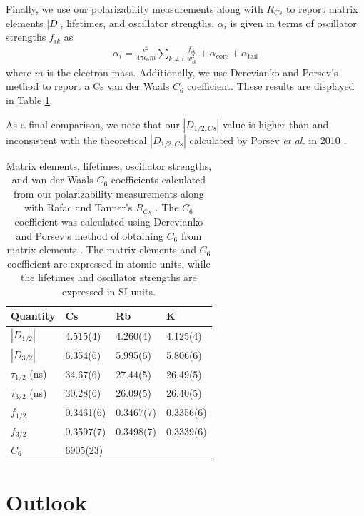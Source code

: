 \documentclass[twocolumn,prl,showpacs,superscriptaddress]{revtex4-1}   %
\newcommand{\acore}{\alpha_{\textrm{core}}}
\newcommand{\atail}{\alpha_{\textrm{tail}}}
\newcommand{\etal}{\textit{et al. }}
\begin{document}
Finally, we use our polarizability measurements along with $R_{Cs}$ to report matrix elements $|D|$, lifetimes, and oscillator strengths. $\alpha_i$ is given in terms of oscillator strengths $f_{ik}$ as 
\begin{align}
	\alpha_i = \frac{e^2}{4 \pi \epsilon_0 m}
	\sum_{k \neq i}
	\frac{f_{ik}}{w_{ik}^2}
	+ \acore
	+ \atail
	\label{polFromOscStr}
\end{align}
where $m$ is the electron mass.
Additionally, we use Derevianko and Porsev's method to report a Cs van der Waals $C_6$ coefficient. These results are displayed in Table \ref{tableMisc}. 

As a final comparison, we note that our $\left|D_{1/2,Cs}\right|$ value is higher than and inconsistent with the theoretical $\left|D_{1/2,Cs}\right|$ calculated by Porsev \etal in 2010 \cite{Porsev2010}.

\begingroup
\begin{table}
\caption{\label{tableMisc}Matrix elements, lifetimes, oscillator strengths, and van der Waals $C_6$ coefficients calculated from our polarizability measurements along with Rafac and Tanner's $R_{Cs}$ \cite{Rafac1998}. The $C_6$ coefficient was calculated using Derevianko and Porsev's method of obtaining $C_6$ from matrix elements \cite{Derevianko2001}. The matrix elements and $C_6$ coefficient are expressed in atomic units, while the lifetimes and oscillator strengths are expressed in SI units.}
\begin{center}
\begin{tabular}{l l l l}
\hline\hline
Quantity & Cs & Rb & K \\
\hline
$\left|D_{1/2}\right|$	& 4.515(4) & 4.260(4) & 4.125(4) \\
$\left|D_{3/2}\right|$	& 6.354(6) & 5.995(6) & 5.806(6) \\
$\tau_{1/2}$ (ns)		& 34.67(6) & 27.44(5) & 26.49(5) \\
$\tau_{3/2}$ (ns)		& 30.28(6) & 26.09(5) & 26.40(5) \\
$f_{1/2}$				& 0.3461(6) & 0.3467(7) & 0.3356(6) \\
$f_{3/2}$				& 0.3597(7) & 0.3498(7) & 0.3339(6) \\
$C_6$					& 6905(23) & & \\
\hline\hline
\end{tabular}
\end{center}
\end{table}
\endgroup

\section{Outlook}
\end{document}
